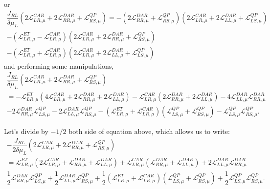 or
\begin{multline*}
\dfrac{J_{RL}}{\delta\mu_{L}}(2\mathcal{L}_{LR,\mu}^{CAR}
+
2\mathcal{L}_{RR,\mu}^{DAR}
+
\mathcal{L}^{QP}_{RS,\mu})
=-(2\mathcal{L}_{RR,\mu}^{DAR}+\mathcal{L}^{QP}_{RS,\mu})(2\mathcal{L}_{LR,\mu}^{CAR}+
2\mathcal{L}_{LL,\mu}^{DAR}+
\mathcal{L}^{QP}_{LS,\mu})
\\-
(
\mathcal{L}_{LR,\mu}^{ET}-\mathcal{L}_{LR,\mu}^{CAR}
)(2\mathcal{L}_{LR,\mu}^{CAR}
+
2\mathcal{L}_{RR,\mu}^{DAR}
+
\mathcal{L}^{QP}_{RS,\mu})
\\
-
(\mathcal{L}_{LR,\mu}^{ET}+\mathcal{L}_{LR,\mu}^{CAR})(2\mathcal{L}_{LR,\mu}^{CAR}+
2\mathcal{L}_{LL,\mu}^{DAR}+
\mathcal{L}^{QP}_{LS,\mu})
\end{multline*}
and performing some manipulations, 
\begin{multline*}
\dfrac{J_{RL}}{\delta\mu_{L}}(2\mathcal{L}_{LR,\mu}^{CAR}
+
2\mathcal{L}_{RR,\mu}^{DAR}
+
\mathcal{L}^{QP}_{RS,\mu})
\\=
-
\mathcal{L}_{LR,\mu}^{ET}
(4\mathcal{L}_{LR,\mu}^{CAR}
+
2\mathcal{L}_{RR,\mu}^{DAR}
+
2\mathcal{L}_{LL,\mu}^{DAR})
-
\mathcal{L}_{LR,\mu}^{CAR}
(
2\mathcal{L}_{RR,\mu}^{DAR}
+
2\mathcal{L}_{LL,\mu}^{DAR}
)
-4\mathcal{L}_{LL,\mu}^{DAR}\mathcal{L}_{RR,\mu}^{DAR}
\\
-2\mathcal{L}_{RR,\mu}^{DAR}\mathcal{L}^{QP}_{LS,\mu}
-
2\mathcal{L}_{LL,\mu}^{DAR}\mathcal{L}^{QP}_{RS,\mu}
-
(\mathcal{L}_{LR,\mu}^{ET}+\mathcal{L}_{LR,\mu}^{CAR})(\mathcal{L}^{QP}_{LS,\mu}
+
\mathcal{L}^{QP}_{RS,\mu})-
\mathcal{L}^{QP}_{LS,\mu}\mathcal{L}^{QP}_{RS,\mu}.
\end{multline*}

Let's divide by $-1/2$ both side of equation above, which allows us to write: 
\begin{multline}\label{JRL:exp1}
-\dfrac{J_{RL}}{2\delta\mu_{L}}(2\mathcal{L}_{LR,\mu}^{CAR}
+
2\mathcal{L}_{RR,\mu}^{DAR}
+
\mathcal{L}^{QP}_{RS,\mu})
\\=
\mathcal{L}_{LR,\mu}^{ET}
(2\mathcal{L}_{LR,\mu}^{CAR}
+
\mathcal{L}_{RR,\mu}^{DAR}
+
\mathcal{L}_{LL,\mu}^{DAR})
+
\mathcal{L}_{LR,\mu}^{CAR}
(
\mathcal{L}_{RR,\mu}^{DAR}
+
\mathcal{L}_{LL,\mu}^{DAR}
)
+2\mathcal{L}_{LL,\mu}^{DAR}\mathcal{L}_{RR,\mu}^{DAR}
\\
\dfrac{1}{2}\mathcal{L}_{RR,\mu}^{DAR}\mathcal{L}^{QP}_{LS,\mu}
+\dfrac{1}{2}
\mathcal{L}_{LL,\mu}^{DAR}\mathcal{L}^{QP}_{RS,\mu}
+\dfrac{1}{2}
(\mathcal{L}_{LR,\mu}^{ET}+\mathcal{L}_{LR,\mu}^{CAR})(\mathcal{L}^{QP}_{LS,\mu}
+
\mathcal{L}^{QP}_{RS,\mu})
+\dfrac{1}{2}
\mathcal{L}^{QP}_{LS,\mu}\mathcal{L}^{QP}_{RS,\mu}.
\end{multline}

